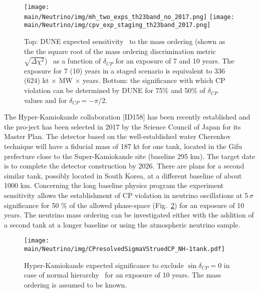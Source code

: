\begin{figure} [htbp!]
\begin{center}
\texttt{[image: \\main/Neutrino/img/mh\_two\_exps\_th23band\_no\_2017.png]}
\texttt{[image: \\main/Neutrino/img/cpv\_exp\_staging\_th23band\_2017.png]}
\caption{\label{fig:dunesensi} Top: DUNE expected sensitivity~\cite{Abi:2018dnh} to the mass ordering (shown as the 
the square root of the mass ordering discrimination metric $\sqrt{\Delta \chi^2}$)
\ as a function of $\delta_{CP}$ for an exposure of 7 and 10 years. The exposure for 7 (10) years in a staged scenario is equivalent to 336 (624) kt $\times$ MW $\times$ years.
Bottom:  
the significance with which CP violation can be determined by DUNE for 75\% and 50\% of $\delta_{CP}$ values
and for $\delta_{CP}=-\pi/2 $.
}
\end{center}
\end{figure}


The Hyper-Kamiokande collaboration [ID158]  
has been recently established and the pro-ject has been selected in 2017 by the Science Council of Japan for its Master Plan. The detector based on the well-established water Cherenkov technique will have a fiducial mass of 187 kt for one tank, located in the Gifu prefecture close to the Super-Kamiokande site (baseline 295 km). 
The target date is to complete the detector construction by 2026.
There are plans for a second similar tank, possibly located in South Korea, at a different baseline of about 1000 km. %
Concerning the long baseline physics program the experiment sensitivity allows the establishment of CP violation in neutrino oscillations at 5\,$\sigma$ significance for 50 \% of the allowed phase-space (Fig.~\ref{fig:hkcpv}) for an exposure of 10 years. The neutrino mass ordering can be investigated either with the addition of a second tank at a longer baseline or using the atmospheric neutrino sample.

\begin{figure} [htbp!]
\begin{center}
\texttt{[image: \\main/Neutrino/img/CPresolvedSigmaVStruedCP\_NH-1tank.pdf]}
\caption{\label{fig:hkcpv} 
Hyper-Kamiokande expected significance to exclude $\sin \delta_{CP} = 0 $  in case of normal hierarchy~\cite{Abe:2018uyc} for an exposure of 10 years. The mass ordering is
assumed to be known. }
\end{center}
\end{figure}


